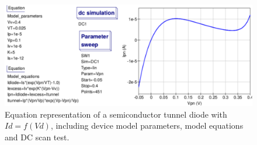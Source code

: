 \documentclass[10pt, a4paper]{report}
\begin{document}
\begin{figure}[h]
	\centering
	\includegraphics*[width=12cm]{pics/chap1/Qucs-S-Ch1-Fig2A.pdf}
	\caption{Equation representation of a semiconductor tunnel diode with $Id = f(Vd)$, including device model parameters, model equations and DC scan test. }
	\label{FigCH1-2}
\end{figure}
\end{document}
